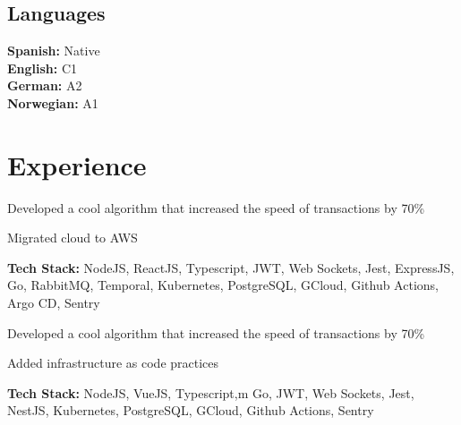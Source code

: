 \documentclass[]{resume}
\begin{document}
\begin{minipage}[t]{0.33\textwidth}
\sectionsep

\subsection{Languages}

\textbf{Spanish:} Native\\
\textbf{English:} C1\\
\textbf{German:} A2\\
\textbf{Norwegian:} A1
%
%

\end{minipage}
\hfill
\begin{minipage}[t]{0.66\textwidth}


\section{Experience}

\vspace{\topsep}
\begin{tightemize}
\item Developed a cool algorithm that increased the speed of transactions by 70\%
\item Migrated cloud to AWS
\item {\bf Tech Stack:} NodeJS, ReactJS, Typescript, JWT, Web Sockets, Jest, ExpressJS, Go, RabbitMQ, Temporal, Kubernetes, PostgreSQL, GCloud, Github Actions, Argo CD, Sentry\newline
\end{tightemize}

\begin{tightemize}
\item Developed a cool algorithm that increased the speed of transactions by 70\%
\item Added infrastructure as code practices
\item {\bf Tech Stack:} NodeJS, VueJS, Typescript,m Go, JWT, Web Sockets, Jest, NestJS, Kubernetes, PostgreSQL, GCloud, Github Actions, Sentry\newline
\end{tightemize}


\end{minipage}
\end{document}
